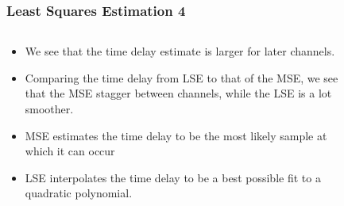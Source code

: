 \documentclass[compress]{beamer}
\begin{document}
\begin{frame} %
    \frametitle{Least Squares Estimation 4}
    \begin{columns}
        \begin{column}{0.5\textwidth}
            \begin{itemize}
                \item We see that the time delay estimate is larger for later channels.
                \item Comparing the time delay from LSE to that of the MSE, we see
                    that the MSE stagger between channels, while the LSE is a lot smoother.
                \item MSE estimates the time delay to be the most likely sample at which
                    it can occur
                \item LSE interpolates the time delay to be a best possible fit to a quadratic polynomial.
            \end{itemize}
        \end{column}
        \begin{column}{0.5\textwidth}
            \begin{figure}
                
            \end{figure}
            \begin{figure}
                
            \end{figure}
        \end{column}
    \end{columns}
\end{frame} %
\end{document}
